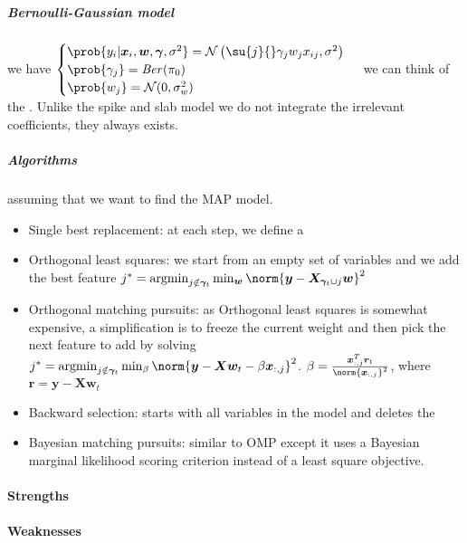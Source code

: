 \subparagraph{Bernoulli-Gaussian model}
we have 
$\begin{cases}
    \prob{y_{i}|\bm{x}_{i},\bm{w}, \bm{\gamma},\sigma^{2}} = \mathcal{N}\left(\su{j}{}
    \gamma_{j}w_{j}x_{ij}, \sigma^{2}\right) \\
    \prob{\gamma_{j}} = \text{\emph{Ber}}(\pi_{0})\\
    \prob{w_{j}} = \mathcal{N}(0, \sigma_{w}^{2})
\end{cases}$
we can think of the . Unlike the
spike and slab model we do not integrate the irrelevant coefficients, they always 
exists.\\
\subparagraph{Algorithms}
assuming that we want to find the MAP model.
\begin{itemize}
    \item Single best replacement: at each step, we define a 
    \item Orthogonal least squares: we start from an empty set of variables and we 
        add the best feature $j^{*} = \argmin_{j\notin\bm{\gamma}_{t}}\min_{\bm{w}}
        \norm{\bm{y}-\bm{X}_{\bm{\gamma}_{t}\cup j}\bm{w}}^{2}$ 
    \item Orthogonal matching pursuits: as Orthogonal least squares is somewhat 
        expensive, a simplification is to freeze the current weight and then pick the 
        next feature to add by solving $j^{*} = \argmin_{j\notin\bm{\gamma}_{t}}
        \min_{\beta} \norm{\bm{y}-\bm{X}\bm{w}_{t} - \beta\bm{x}_{:,j}}^{2}$.
        $\beta = \frac{\bm{x}_{:,j}^{T}\bm{r}_{t}}{\norm{\bm{x}_{:,j}}^{2}}$, where
        $\bm{r} = \bm{y}-\bm{X}\bm{w}_{t}$
    \item Backward selection: starts with all variables in the model and deletes the
    \item Bayesian matching pursuits: similar to OMP except it uses a Bayesian marginal
        likelihood scoring criterion instead of a least square objective.
\end{itemize}

\paragraph{Strengths}
\paragraph{Weaknesses}
